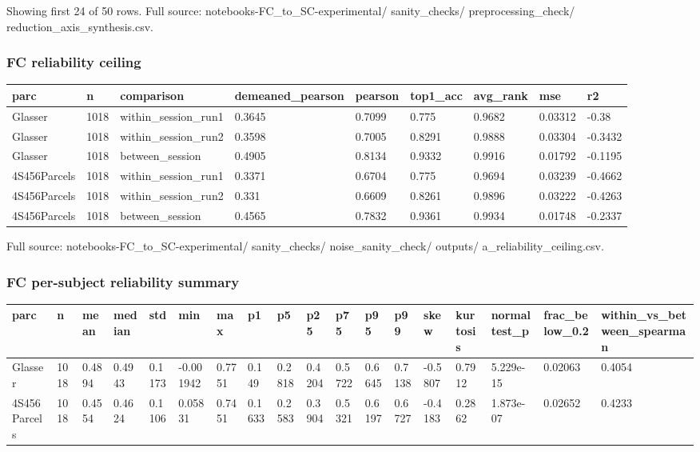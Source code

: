 Showing first 24 of 50 rows. Full source: notebooks-FC\_to\_SC-experimental/ sanity\_checks/ preprocessing\_check/ reduction\_axis\_synthesis.csv.

\subsubsection{FC reliability ceiling}\label{fc-reliability-ceiling}

{\def\LTcaptype{none} %
\begin{longtable}[]{@{}lllllllll@{}}
\toprule\noalign{}
parc & n & comparison & demeaned\_pearson & pearson & top1\_acc & avg\_rank & mse & r2 \\
\midrule\noalign{}
\endhead
\bottomrule\noalign{}
\endlastfoot
Glasser & 1018 & within\_session\_run1 & 0.3645 & 0.7099 & 0.775 & 0.9682 & 0.03312 & -0.38 \\
Glasser & 1018 & within\_session\_run2 & 0.3598 & 0.7005 & 0.8291 & 0.9888 & 0.03304 & -0.3432 \\
Glasser & 1018 & between\_session & 0.4905 & 0.8134 & 0.9332 & 0.9916 & 0.01792 & -0.1195 \\
4S456Parcels & 1018 & within\_session\_run1 & 0.3371 & 0.6704 & 0.775 & 0.9694 & 0.03239 & -0.4662 \\
4S456Parcels & 1018 & within\_session\_run2 & 0.331 & 0.6609 & 0.8261 & 0.9896 & 0.03222 & -0.4263 \\
4S456Parcels & 1018 & between\_session & 0.4565 & 0.7832 & 0.9361 & 0.9934 & 0.01748 & -0.2337 \\
\end{longtable}
}

Full source: notebooks-FC\_to\_SC-experimental/ sanity\_checks/ noise\_sanity\_check/ outputs/ a\_reliability\_ceiling.csv.

\subsubsection{FC per-subject reliability summary}\label{fc-per-subject-reliability-summary}

{\def\LTcaptype{none} %
\begin{longtable}[]{@{}llllllllllllllllll@{}}
\toprule\noalign{}
parc & n & mean & median & std & min & max & p1 & p5 & p25 & p75 & p95 & p99 & skew & kurtosis & normaltest\_p & frac\_below\_0.2 & within\_vs\_between\_spearman \\
\midrule\noalign{}
\endhead
\bottomrule\noalign{}
\endlastfoot
Glasser & 1018 & 0.4894 & 0.4943 & 0.1173 & -0.001942 & 0.7751 & 0.149 & 0.2818 & 0.4204 & 0.5722 & 0.6645 & 0.7138 & -0.5807 & 0.7912 & 5.229e-15 & 0.02063 & 0.4054 \\
4S456Parcels & 1018 & 0.4554 & 0.4624 & 0.1106 & 0.05831 & 0.7451 & 0.1633 & 0.2583 & 0.3904 & 0.5321 & 0.6197 & 0.6727 & -0.4183 & 0.2862 & 1.873e-07 & 0.02652 & 0.4233 \\
\end{longtable}
}

